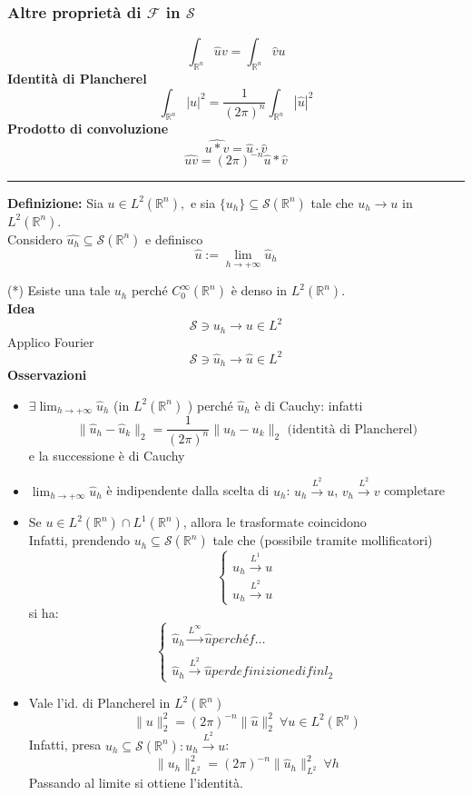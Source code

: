 \documentclass[a4paper]{article}
\newcommand{\R}{\mathbb{R}}
\newcommand{\divider}{\noindent\rule{\textwidth}{0.5pt}}
\begin{document}
\subsubsection{Altre proprietà di $\mathcal F$ in $\mathcal S$}
\[ \int_{\R^n}^{} \hat{u}v=\int_{\R^n}^{} \hat{v}u\]
\textbf{Identità di Plancherel} 
\[\int_{\R^n}^{} |u|^2=\frac{1}{(2\pi)^n}\int_{\R^n}^{} |\hat{u}|^2\]
\textbf{Prodotto di convoluzione} 
\[\widehat{u * v}=\hat{u}\cdot \hat{v}\]
\[\widehat{uv}=(2\pi)^{-n}\hat{u}* \hat{v}\]
\divider
\begin{tcolorbox}
	\textbf{Definizione: }Sia $u\in L^{2}(\R^n),$ e sia $\{u_h\} \subseteq  \mathcal S(\R^n)$ tale che $u_h\to u$ in $L^{2}(\R^n)$.\\
	Considero $\hat{u_h}\subseteq  \mathcal S(\R^n)$ e definisco 
	\[\hat{u}:=\lim_{h \to +\infty} \hat{u}_h\]

\end{tcolorbox}
(*) Esiste una tale $u_h$ perché $C_0^\infty(\R^n)$ è denso in $L^{2}(\R^n)$.\\
\textbf{Idea} 
\[\mathcal S\ni u_h\to u\in L^{2}\]
Applico Fourier 
\[\mathcal S \ni  \hat{u}_h\to \hat{ u}\in L^{2}\]
\textbf{Osservazioni} 
\begin{itemize}
	\item $\exists \lim_{h \to +\infty} \hat{u}_h$ (in $L^{2}(\R^n)$ ) perché $\hat{u}_h$ è di Cauchy: infatti
		\[\|\hat{u}_h-\hat{u}_k\|_2=\frac{1}{(2\pi)^n}\|u_h-u_k\|_2\text{ (identità di Plancherel)}\]
		e la successione è di Cauchy
	\item $\lim_{h \to +\infty} \hat{u}_h$ è indipendente dalla scelta di $u_h $: $u_h\xrightarrow{L^2}u$,  $v_h\xrightarrow{L^2}v$ completare
	\item Se $u\in L^{2}(\R^n)\cap L^{1}(\R^n)$, allora le trasformate coincidono
		\\Infatti, prendendo $u_h \subseteq  \mathcal S(\R^n)$ tale che (possibile tramite mollificatori)
		\[\begin{cases}
			u_h\xrightarrow{L^1}u\\
		u_h\xrightarrow{L^2}u
	\end{cases}\]
	si ha:
	\[\begin{cases}
		\hat{u}_h\xrightarrow{L^\infty}\hat{u} perché f\ldots\\
		\\ \hat{u}_h\xrightarrow{L^2}\hat{u} per definizione di f in l_2 
	\end{cases}\]
\item Vale l'id. di Plancherel in $L^{2}(\R^n)$ 
	\[\|u\|_2^2=(2\pi)^{-n}\|\hat{u}\|^2_2\ \forall u\in L^{2}(\R^n)\]
	Infatti, presa $u_h \subseteq  \mathcal S(\R^n):u_h\xrightarrow{L^2}u$:
	\[\|u_h\|^2_{L^2}=(2\pi)^{-n}\|\hat{u}_h\|^2_{L^2}\ \forall h\]
	Passando al limite si ottiene l'identità.
\end{itemize}
\end{document}
